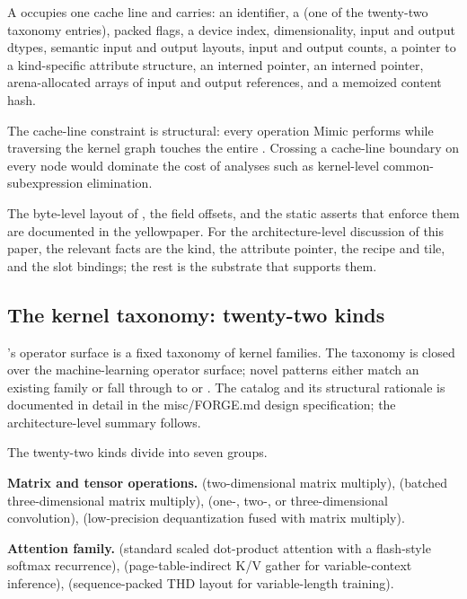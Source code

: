 \begin{definition}[KernelNode]
\label{def:ir002-kernelnode}
A  occupies one cache line and carries: an identifier, a  (one of the twenty-two taxonomy entries), packed flags, a device index, dimensionality, input and output dtypes, semantic input and output layouts, input and output counts, a pointer to a kind-specific attribute structure, an interned  pointer, an interned  pointer, arena-allocated arrays of input and output  references, and a memoized content hash.
\end{definition}

The cache-line constraint is structural: every operation Mimic performs while traversing the kernel graph touches the entire .
Crossing a cache-line boundary on every node would dominate the cost of analyses such as kernel-level common-subexpression elimination.

The byte-level layout of , the field offsets, and the static asserts that enforce them are documented in the yellowpaper.
For the architecture-level discussion of this paper, the relevant facts are the kind, the attribute pointer, the recipe and tile, and the slot bindings; the rest is the substrate that supports them.

\subsection{The kernel taxonomy: twenty-two kinds}
\label{sec:ir002-kinds}

's operator surface is a fixed taxonomy of kernel families.
The taxonomy is closed over the machine-learning operator surface; novel patterns either match an existing family or fall through to  or .
The catalog and its structural rationale is documented in detail in the misc/FORGE.md design specification; the architecture-level summary follows.

The twenty-two kinds divide into seven groups.

\textbf{Matrix and tensor operations.}
 (two-dimensional matrix multiply),  (batched three-dimensional matrix multiply),  (one-, two-, or three-dimensional convolution),  (low-precision dequantization fused with matrix multiply).

\textbf{Attention family.}
 (standard scaled dot-product attention with a flash-style softmax recurrence),  (page-table-indirect K/V gather for variable-context inference),  (sequence-packed THD layout for variable-length training).

